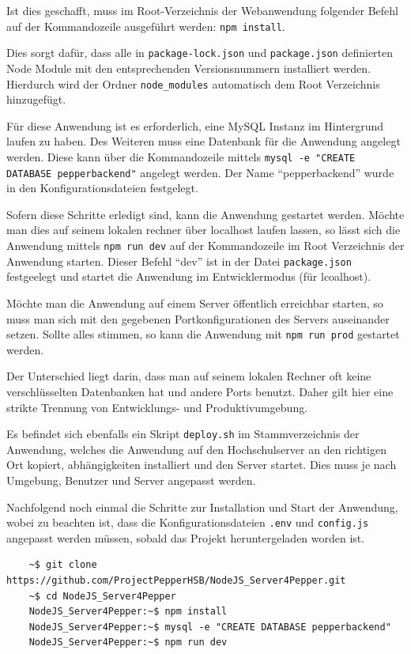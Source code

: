 Ist dies geschafft, muss im Root-Verzeichnis der Webanwendung folgender Befehl auf der Kommandozeile ausgeführt werden:
\verb|npm install|.

Dies sorgt dafür, dass alle in \verb|package-lock.json| und \verb|package.json| definierten Node Module mit den entsprechenden
Versionsnummern installiert werden. Hierdurch wird der Ordner \verb|node_modules| automatisch dem Root Verzeichnis hinzugefügt.

Für diese Anwendung ist es erforderlich, eine MySQL Instanz im Hintergrund laufen zu haben. Des Weiteren muss eine Datenbank
für die Anwendung angelegt werden. Diese kann über die Kommandozeile mittels \verb|mysql -e "CREATE DATABASE pepperbackend"|
angelegt werden. Der Name ``pepperbackend'' wurde in den Konfigurationsdateien festgelegt.

Sofern diese Schritte erledigt sind, kann die Anwendung gestartet werden. Möchte man dies auf seinem lokalen rechner über
localhost laufen lassen, so lässt sich die Anwendung mittels \verb|npm run dev| auf der Kommandozeile im Root Verzeichnis
der Anwendung starten. Dieser Befehl ``dev'' ist in der Datei \verb|package.json| festgeelegt und startet die Anwendung im
Entwicklermodus (für lcoalhost).

Möchte man die Anwendung auf einem Server öffentlich erreichbar starten, so muss man sich mit den gegebenen Portkonfigurationen
des Servers auseinander setzen. Sollte alles stimmen, so kann die Anwendung mit \verb|npm run prod| gestartet werden.

Der Unterschied liegt darin, dass man auf seinem lokalen Rechner oft keine verschlüsselten Datenbanken hat und andere Ports benutzt.
Daher gilt hier eine strikte Trennung von Entwicklungs- und Produktivumgebung.

Es befindet sich ebenfalls ein Skript \verb|deploy.sh| im Stammverzeichnis der Anwendung, welches die Anwendung auf den Hochschulserver
an den richtigen Ort kopiert, abhängigkeiten installiert und den Server startet. Dies muss je nach Umgebung, Benutzer und Server
angepasst werden.

Nachfolgend noch einmal die Schritte zur Installation und Start der Anwendung, wobei zu beachten ist,
dass die Konfigurationsdateien \verb|.env| und \verb|config.js| angepasst werden müssen, sobald das Projekt heruntergeladen
worden ist.
\begin{lstlisting}
    ~$ git clone https://github.com/ProjectPepperHSB/NodeJS_Server4Pepper.git 
    ~$ cd NodeJS_Server4Pepper
    NodeJS_Server4Pepper:~$ npm install
    NodeJS_Server4Pepper:~$ mysql -e "CREATE DATABASE pepperbackend"
    NodeJS_Server4Pepper:~$ npm run dev
\end{lstlisting}


